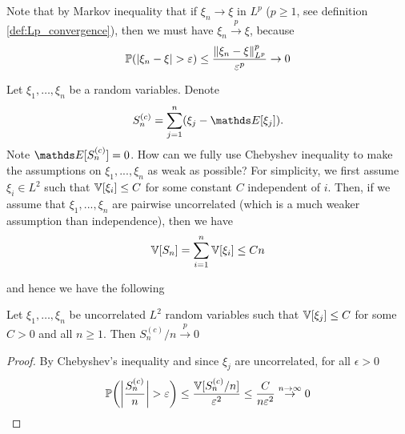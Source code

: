 Note that by Markov inequality that if $\xi_n \to \xi$ in $L^p$ ($p\geq 1$, see definition \ref{def:Lp_convergence}), then we must have $\xi_n \xrightarrow{p} \xi$, because
\begin{equation}
    \mathbb{P}(|\xi_n - \xi| > \varepsilon) \leq \frac{\left\| \xi_n - \xi \right\|_{L^p}^p}{\varepsilon^p} \to 0
\end{equation}

Let $\xi_1, \dots, \xi_n$ be a random variables. Denote
\begin{equation*}
    S_n^{(c)} = \sum_{j=1}^n (\xi_j - \E[\xi_j]).
\end{equation*}
Note $\E[S_n^{(c)}] = 0$. How can we fully use Chebyshev inequality to make the assumptions on $\xi_1,...,\xi_n$ as weak as possible? For simplicity, we first assume $\xi_i \in L^2$ such that $\mathbb{V}[\xi_i] \leq C$ for some constant $C$ independent of $i$. Then, if we assume that $\xi_1,...,\xi_n$ are pairwise uncorrelated (which is a much weaker assumption than independence), then we have 
\begin{equation}
    \mathbb{V}[S_n] = \sum_{i=1}^n \mathbb{V}[\xi_i] \leq Cn
\end{equation}

and hence we have the following 


\begin{theorem} \label{thm:WLLN2}
Let $\xi_1, \dots, \xi_n$ be uncorrelated $L^2$ random variables such that $\mathbb{V}[\xi_j] \le C$ for some $C > 0$ and all $n \ge 1$. Then $S_n^{(c)}/n \xrightarrow{p} 0$
\end{theorem}
\begin{proof}
By Chebyshev's inequality and since $\xi_j$ are uncorrelated, for all $\epsilon > 0$
\begin{equation}
    \mathbb{P}  \bigg(\bigg|\frac{S_n^{(c)}}{n}\bigg| > \varepsilon\bigg) \leq \frac{\mathbb{V}[S_n^{(c)}/n]}{\varepsilon^2} \leq 
    \frac{C}{n \varepsilon^2} \overset{n \to \infty}{\to} 0
\end{equation}
\end{proof}

